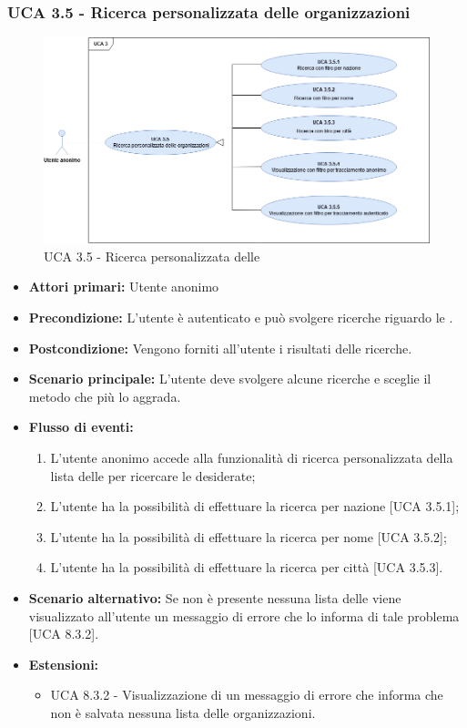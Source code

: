 \subsubsection{UCA 3.5 - Ricerca personalizzata delle organizzazioni}%
\begin{figure}[h]
	\centering
	
	\includegraphics[scale=0.5, center]{Sezioni/UseCase/Immagini/UCA3.5.png}
	\caption{UCA 3.5 - Ricerca personalizzata delle }
\end{figure}
\begin{itemize}
	\item \textbf{Attori primari:} Utente anonimo
	\item \textbf{Precondizione:} L'utente è autenticato e può svolgere ricerche riguardo le .
	\item \textbf{Postcondizione:} Vengono forniti all'utente i risultati delle ricerche.
	\item \textbf{Scenario principale:} L'utente deve svolgere alcune ricerche e sceglie il metodo che più lo aggrada.
	\item \textbf{Flusso di eventi:} 
	\begin{enumerate}
		\item L'utente anonimo accede alla funzionalità di ricerca personalizzata della lista delle  per ricercare le  desiderate;
		\item L'utente ha la possibilità di effettuare la ricerca per nazione [UCA 3.5.1];
		\item L'utente ha la possibilità di effettuare la ricerca per nome [UCA 3.5.2];
		\item L'utente ha la possibilità di effettuare la ricerca per città [UCA 3.5.3].
	\end{enumerate}
	\item \textbf{Scenario alternativo:} Se non è presente nessuna lista delle  viene visualizzato all'utente un messaggio di errore che lo informa di tale problema [UCA 8.3.2].
	\item \textbf{Estensioni:}
	\begin{itemize}
		\item UCA 8.3.2 - Visualizzazione di un messaggio di errore che informa che non è salvata nessuna lista delle organizzazioni.
	\end{itemize}
\end{itemize}

